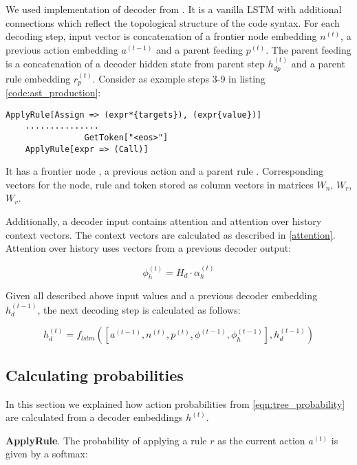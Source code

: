We used implementation of decoder from \cite{Yin2017}. It is a vanilla LSTM with additional connections which reflect the topological structure of the code syntax. For each decoding step, input vector is concatenation of a frontier node embedding $n^{(t)}$, a previous action embedding $a^{(t-1)}$ and a parent feeding $p^{(t)}$. The parent feeding is a concatenation of a decoder hidden state from parent step $h_{dp}^{(t)}$ and a parent rule embedding $r_p^{(t)}$. Consider as example steps 3-9 in listing \ref{code:ast_production}: 
    
\begin{verbatim}
ApplyRule[Assign => (expr*{targets}), (expr{value})]
    ...............
                GetToken["<eos>"]
    ApplyRule[expr => (Call)]
\end{verbatim}

It has a frontier node , a previous action  and a parent rule . Corresponding vectors for the node, rule and token stored as column vectors in matrices $W_n$, $W_r$, $W_v$.

Additionally, a decoder input contains attention and attention over history context vectors. The context vectors are calculated as described in \cref{attention}. Attention over history uses vectors from a previous decoder output:

\begin{equation}
    \phi_h^{(t)} = H_d\cdot\alpha_h^{(t)}
\end{equation}

Given all described above input values and a previous decoder embedding $h_d^{(t-1)}$, the next decoding step is calculated as follows:

\begin{equation}
    h_d^{(t)}=f_{lstm}([a^{(t-1)}, n^{(t)}, p^{(t)}, \phi^{(t-1)}, \phi_h^{(t-1)}], h_d^{(t-1)})
\end{equation}

\subsection{Calculating probabilities}
In this section we explained how action probabilities from  \cref{eqn:tree_probability} are calculated from a decoder embeddings $h^{(t)}$.

\textbf{ApplyRule}. The probability of applying a rule $r$ as the current action $a^{(t)}$ is given by a softmax:

